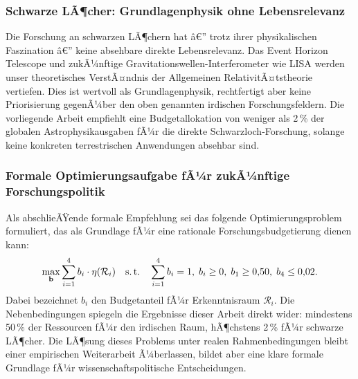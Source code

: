 ﻿\documentclass[a4paper,12pt]{article}
\theoremstyle{definition}
\begin{document}
\subsubsection{Schwarze LÃ¶cher: Grundlagenphysik ohne Lebensrelevanz}

Die Forschung an schwarzen LÃ¶chern hat â€” trotz ihrer physikalischen Faszination
â€” keine absehbare direkte Lebensrelevanz. Das Event Horizon Telescope und
zukÃ¼nftige Gravitationswellen-Interferometer wie LISA werden unser theoretisches
VerstÃ¤ndnis der Allgemeinen RelativitÃ¤tstheorie vertiefen. Dies ist wertvoll als
Grundlagenphysik, rechtfertigt aber keine Priorisierung gegenÃ¼ber den oben
genannten irdischen Forschungsfeldern. Die vorliegende Arbeit empfiehlt eine
Budgetallokation von weniger als 2\,\% der globalen Astrophysikausgaben fÃ¼r
die direkte Schwarzloch-Forschung, solange keine konkreten terrestrischen
Anwendungen absehbar sind.

\subsubsection{Formale Optimierungsaufgabe fÃ¼r zukÃ¼nftige Forschungspolitik}

Als abschlieÃŸende formale Empfehlung sei das folgende Optimierungsproblem
formuliert, das als Grundlage fÃ¼r eine rationale Forschungsbudgetierung dienen
kann:
\[
    \max_{\mathbf{b}} \sum_{i=1}^{4} b_i \cdot \eta(\mathcal{R}_i)
    \quad \text{s.\,t.} \quad
    \sum_{i=1}^{4} b_i = 1,\; b_i \geq 0,\; b_1 \geq 0{,}50,\; b_4 \leq 0{,}02.
\]
Dabei bezeichnet $b_i$ den Budgetanteil fÃ¼r Erkenntnisraum $\mathcal{R}_i$.
Die Nebenbedingungen spiegeln die Ergebnisse dieser Arbeit direkt wider:
mindestens 50\,\% der Ressourcen fÃ¼r den irdischen Raum, hÃ¶chstens 2\,\% fÃ¼r
schwarze LÃ¶cher. Die LÃ¶sung dieses Problems unter realen Rahmenbedingungen
bleibt einer empirischen Weiterarbeit Ã¼berlassen, bildet aber eine klare
formale Grundlage fÃ¼r wissenschaftspolitische Entscheidungen.
\end{document}
